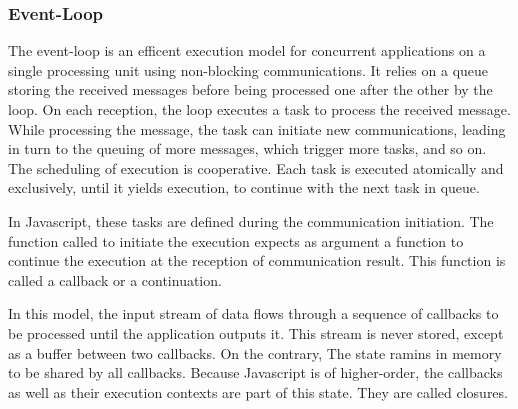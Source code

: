 
\subsubsection{Event-Loop}

The event-loop is an efficent execution model for concurrent applications on a single processing unit using non-blocking communications.
It relies on a queue storing the received messages before being processed one after the other by the loop.
On each reception, the loop executes a task to process the received message.
While processing the message, the task can initiate new communications, leading in turn to the queuing of more messages, which trigger more tasks, and so on.
The scheduling of execution is cooperative.
Each task is executed atomically and exclusively, until it yields execution, to continue with the next task in queue.



In Javascript, these tasks are defined during the communication initiation.
The function called to initiate the execution expects as argument a function to continue the execution at the reception of communication result.
This function is called a callback or a continuation.

In this model, the input stream of data flows through a sequence of callbacks to be processed until the application outputs it.
This stream is never stored, except as a buffer between two callbacks.
On the contrary, The state ramins in memory to be shared by all callbacks.
Because Javascript is of higher-order, the callbacks as well as their execution contexts are part of this state.
They are called closures.




